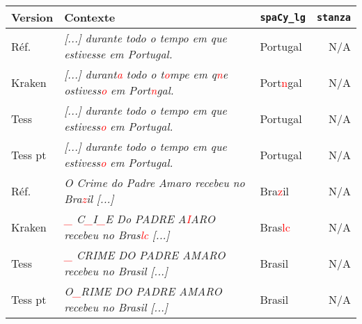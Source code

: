 \begin{tabular}{|l|p{7.5cm}|l|r|}

\hline

\bf{Version} & \bf {Contexte} & \bf{\texttt{spaCy\_lg}}&\bf{\texttt{stanza}}\\
\hline

Réf.\ & \textit{[...] durante todo o tempo em que estivesse em Portugal.}& Portugal& N/A \\

Kraken &\textit{[...] durant\textcolor{red}{a} todo o t\textcolor{red}{o}mpe
em q\textcolor{red}{n}e ostivess\textcolor{red}{o} em Port\textcolor{red}{n}gal.} & Port\textcolor{red}{n}gal & N/A \\ 
 Tess & \textit{[...] durante todo o tempo
em que estivess\textcolor{red}{o} em Portugal.} &Portugal  & N/A \\
Tess pt & \textit{[...] durante todo o tempo
em que estivess\textcolor{red}{o} em Portugal.}  &Portugal & N/A\\
\hline 
Réf.\ & \textit{O Crime do Padre Amaro recebeu no Bra\textcolor{red}{z}il [...] } &Bra\textcolor{red}{z}il &N/A \\
 Kraken &\textit{\textcolor{red}{\_} C\textcolor{red}{\_}I\textcolor{red}{\_}E Do PADRE A\textcolor{red}{I}ARO recebeu no Bras\textcolor{red}{lc} [...] } &Bras\textcolor{red}{lc} & N/A\\ 
 Tess &\textit{\textcolor{red}{\_} CRIME DO PADRE AMARO recebeu no Brasil [...] } &  Brasil& N/A \\
Tess pt &\textit{O\textcolor{red}{\_}RIME DO PADRE AMARO recebeu no Brasil [...] } & Brasil & N/A \\

\hline 

\end{tabular}
